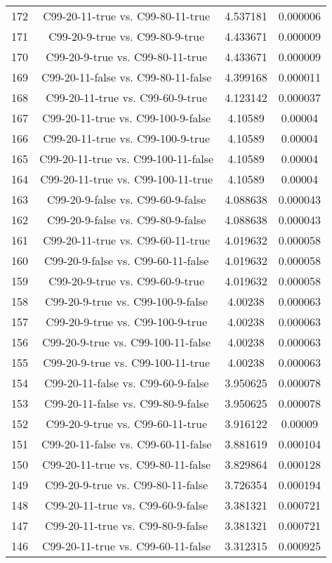 \documentclass[a4paper,10pt]{article}
\begin{document}
\begin{landscape}
\begin{table}[!htp]
\begin{tabular}{cccc}
172&C99-20-11-true vs. C99-80-11-true&4.537181&0.000006\\
171&C99-20-9-true vs. C99-80-9-true&4.433671&0.000009\\
170&C99-20-9-true vs. C99-80-11-true&4.433671&0.000009\\
169&C99-20-11-false vs. C99-80-11-false&4.399168&0.000011\\
168&C99-20-11-true vs. C99-60-9-true&4.123142&0.000037\\
167&C99-20-11-true vs. C99-100-9-false&4.10589&0.00004\\
166&C99-20-11-true vs. C99-100-9-true&4.10589&0.00004\\
165&C99-20-11-true vs. C99-100-11-false&4.10589&0.00004\\
164&C99-20-11-true vs. C99-100-11-true&4.10589&0.00004\\
163&C99-20-9-false vs. C99-60-9-false&4.088638&0.000043\\
162&C99-20-9-false vs. C99-80-9-false&4.088638&0.000043\\
161&C99-20-11-true vs. C99-60-11-true&4.019632&0.000058\\
160&C99-20-9-false vs. C99-60-11-false&4.019632&0.000058\\
159&C99-20-9-true vs. C99-60-9-true&4.019632&0.000058\\
158&C99-20-9-true vs. C99-100-9-false&4.00238&0.000063\\
157&C99-20-9-true vs. C99-100-9-true&4.00238&0.000063\\
156&C99-20-9-true vs. C99-100-11-false&4.00238&0.000063\\
155&C99-20-9-true vs. C99-100-11-true&4.00238&0.000063\\
154&C99-20-11-false vs. C99-60-9-false&3.950625&0.000078\\
153&C99-20-11-false vs. C99-80-9-false&3.950625&0.000078\\
152&C99-20-9-true vs. C99-60-11-true&3.916122&0.00009\\
151&C99-20-11-false vs. C99-60-11-false&3.881619&0.000104\\
150&C99-20-11-true vs. C99-80-11-false&3.829864&0.000128\\
149&C99-20-9-true vs. C99-80-11-false&3.726354&0.000194\\
148&C99-20-11-true vs. C99-60-9-false&3.381321&0.000721\\
147&C99-20-11-true vs. C99-80-9-false&3.381321&0.000721\\
146&C99-20-11-true vs. C99-60-11-false&3.312315&0.000925\\

\end{tabular}
\end{table}
\end{landscape}
\end{document}
